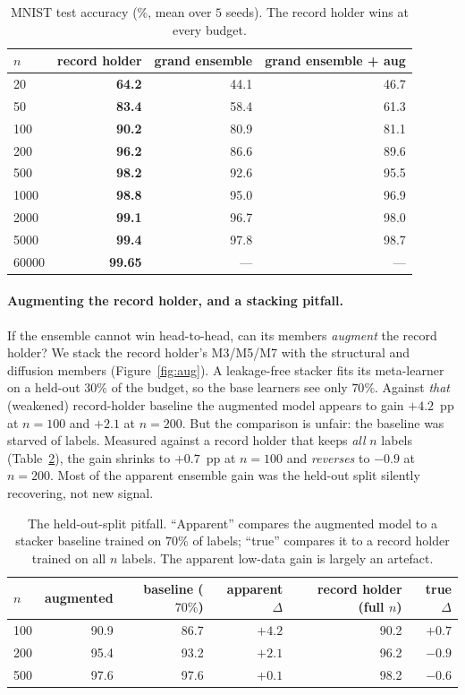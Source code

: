 \documentclass{article}
\begin{document}
\begin{table}[t]
\caption{MNIST test accuracy (\%, mean over $5$ seeds). The record holder wins at every budget.}
\label{tab:eff}
\centering
\begin{tabular}{@{}lrrr@{}}
\toprule
$n$ & record holder & grand ensemble & grand ensemble + aug \\
\midrule
20    & \textbf{64.2} & 44.1 & 46.7 \\
50    & \textbf{83.4} & 58.4 & 61.3 \\
100   & \textbf{90.2} & 80.9 & 81.1 \\
200   & \textbf{96.2} & 86.6 & 89.6 \\
500   & \textbf{98.2} & 92.6 & 95.5 \\
1000  & \textbf{98.8} & 95.0 & 96.9 \\
2000  & \textbf{99.1} & 96.7 & 98.0 \\
5000  & \textbf{99.4} & 97.8 & 98.7 \\
60000 & \textbf{99.65}& --- & --- \\
\bottomrule
\end{tabular}
\end{table}

\paragraph{Augmenting the record holder, and a stacking pitfall.}
If the ensemble cannot win head-to-head, can its members \emph{augment} the record holder? We
stack the record holder's M3/M5/M7 with the structural and diffusion members
(Figure~\ref{fig:aug}). A leakage-free stacker fits its meta-learner on a held-out $30\%$ of the
budget, so the base learners see only $70\%$. Against \emph{that} (weakened) record-holder
baseline the augmented model appears to gain $+4.2$~pp at $n\!=\!100$ and $+2.1$ at $n\!=\!200$.
But the comparison is unfair: the baseline was starved of labels. Measured against a record
holder that keeps \emph{all} $n$ labels (Table~\ref{tab:pitfall}), the gain shrinks to $+0.7$~pp
at $n\!=\!100$ and \emph{reverses} to $-0.9$ at $n\!=\!200$. Most of the apparent ensemble gain
was the held-out split silently recovering, not new signal.

\begin{table}[t]
\caption{The held-out-split pitfall. ``Apparent'' compares the augmented model to a stacker
baseline trained on $70\%$ of labels; ``true'' compares it to a record holder trained on all
$n$ labels. The apparent low-data gain is largely an artefact.}
\label{tab:pitfall}
\centering
\begin{tabular}{@{}lrrrrr@{}}
\toprule
$n$ & augmented & baseline ($70\%$) & apparent $\Delta$ & record holder (full $n$) & true $\Delta$ \\
\midrule
100 & 90.9 & 86.7 & $+4.2$ & 90.2 & $+0.7$ \\
200 & 95.4 & 93.2 & $+2.1$ & 96.2 & $-0.9$ \\
500 & 97.6 & 97.6 & $+0.1$ & 98.2 & $-0.6$ \\
\bottomrule
\end{tabular}
\end{table}
\end{document}
